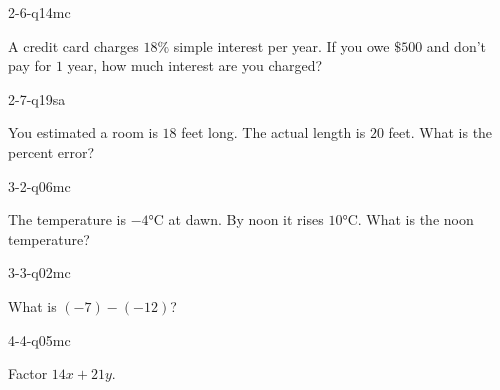 \begin{practiceQuestion}{2-6-q14}{mc}
\begin{questionText}
A credit card charges $18\%$ simple interest per year. If you owe $\$500$ and don't pay for $1$ year, how much interest are you charged?
\end{questionText}
\end{practiceQuestion}

\begin{practiceQuestion}{2-7-q19}{sa}
\begin{questionText}
You estimated a room is $18$ feet long. The actual length is $20$ feet. What is the percent error?
\end{questionText}
\end{practiceQuestion}

\begin{practiceQuestion}{3-2-q06}{mc}
\begin{questionText}
The temperature is $-4°$C at dawn. By noon it rises $10°$C. What is the noon temperature?
\end{questionText}
\end{practiceQuestion}

\begin{practiceQuestion}{3-3-q02}{mc}
\begin{questionText}
What is $(-7) - (-12)$?
\end{questionText}
\end{practiceQuestion}

\begin{practiceQuestion}{4-4-q05}{mc}
\begin{questionText}
Factor $14x + 21y$.
\end{questionText}
\end{practiceQuestion}

